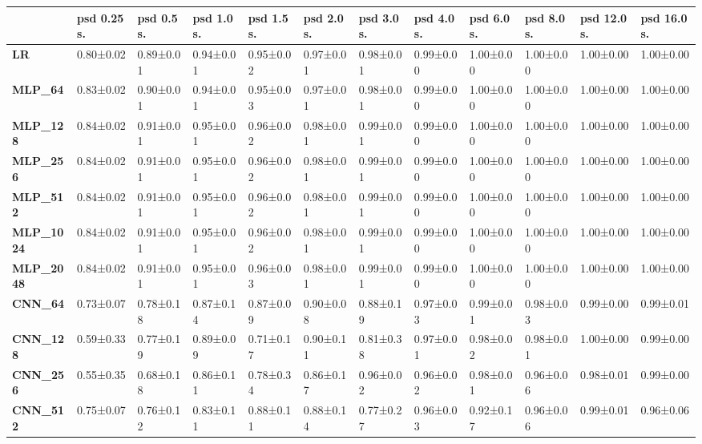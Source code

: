 \begin{tabular}{llllllllllll}
\toprule
{} & psd 0.25 s. & psd 0.5 s. & psd 1.0 s. & psd 1.5 s. & psd 2.0 s. & psd 3.0 s. & psd 4.0 s. & psd 6.0 s. & psd 8.0 s. & psd 12.0 s. & psd 16.0 s. \\
\midrule
\textbf{LR            } &   0.80±0.02 &  0.89±0.01 &  0.94±0.01 &  0.95±0.02 &  0.97±0.01 &  0.98±0.01 &  0.99±0.00 &  1.00±0.00 &  1.00±0.00 &   1.00±0.00 &   1.00±0.00 \\
\textbf{MLP\_64        } &   0.83±0.02 &  0.90±0.01 &  0.94±0.01 &  0.95±0.03 &  0.97±0.01 &  0.98±0.01 &  0.99±0.00 &  1.00±0.00 &  1.00±0.00 &   1.00±0.00 &   1.00±0.00 \\
\textbf{MLP\_128       } &   0.84±0.02 &  0.91±0.01 &  0.95±0.01 &  0.96±0.02 &  0.98±0.01 &  0.99±0.01 &  0.99±0.00 &  1.00±0.00 &  1.00±0.00 &   1.00±0.00 &   1.00±0.00 \\
\textbf{MLP\_256       } &   0.84±0.02 &  0.91±0.01 &  0.95±0.01 &  0.96±0.02 &  0.98±0.01 &  0.99±0.01 &  0.99±0.00 &  1.00±0.00 &  1.00±0.00 &   1.00±0.00 &   1.00±0.00 \\
\textbf{MLP\_512       } &   0.84±0.02 &  0.91±0.01 &  0.95±0.01 &  0.96±0.02 &  0.98±0.01 &  0.99±0.01 &  0.99±0.00 &  1.00±0.00 &  1.00±0.00 &   1.00±0.00 &   1.00±0.00 \\
\textbf{MLP\_1024      } &   0.84±0.02 &  0.91±0.01 &  0.95±0.01 &  0.96±0.02 &  0.98±0.01 &  0.99±0.01 &  0.99±0.00 &  1.00±0.00 &  1.00±0.00 &   1.00±0.00 &   1.00±0.00 \\
\textbf{MLP\_2048      } &   0.84±0.02 &  0.91±0.01 &  0.95±0.01 &  0.96±0.03 &  0.98±0.01 &  0.99±0.01 &  0.99±0.00 &  1.00±0.00 &  1.00±0.00 &   1.00±0.00 &   1.00±0.00 \\
\textbf{CNN\_64        } &   0.73±0.07 &  0.78±0.18 &  0.87±0.14 &  0.87±0.09 &  0.90±0.08 &  0.88±0.19 &  0.97±0.03 &  0.99±0.01 &  0.98±0.03 &   0.99±0.00 &   0.99±0.01 \\
\textbf{CNN\_128       } &   0.59±0.33 &  0.77±0.19 &  0.89±0.09 &  0.71±0.17 &  0.90±0.11 &  0.81±0.38 &  0.97±0.01 &  0.98±0.02 &  0.98±0.01 &   1.00±0.00 &   0.99±0.00 \\
\textbf{CNN\_256       } &   0.55±0.35 &  0.68±0.18 &  0.86±0.11 &  0.78±0.34 &  0.86±0.17 &  0.96±0.02 &  0.96±0.02 &  0.98±0.01 &  0.96±0.06 &   0.98±0.01 &   0.99±0.00 \\
\textbf{CNN\_512       } &   0.75±0.07 &  0.76±0.12 &  0.83±0.11 &  0.88±0.11 &  0.88±0.14 &  0.77±0.27 &  0.96±0.03 &  0.92±0.17 &  0.96±0.06 &   0.99±0.01 &   0.96±0.06 \\

\end{tabular}
